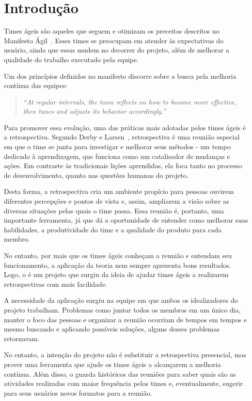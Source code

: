 \section{Introdução}
Times ágeis são aqueles que seguem e otimizam os preceitos descritos no Manifesto Ágil~\cite{manifesto}. Esses times se preocupam em atender às expectativas do usuário, ainda que essas mudem no decorrer do projeto, além de melhorar a qualidade do trabalho executado pela equipe.

Um dos princípios definidos no manifesto discorre sobre a busca pela melhoria contínua das equipes:

\begin{quote}
	\textit{``At regular intervals, the team reflects on how to become more effective, then tunes and adjusts its behavior accordingly.''}~\cite{manifesto}
\end{quote}

 Para promover essa evolução, uma das práticas mais adotadas pelos times ágeis é a retrospectiva. Segundo Derby e Larsen~\cite{retrospectives}, retrospectiva é uma reunião especial em que o time se junta para investigar e melhorar seus métodos - um tempo dedicado à aprendizagem, que funciona como um catalisador de mudanças e ações. Em contraste às tradicionais lições aprendidas, ela foca tanto no processo de desenvolvimento, quanto nas questões humanas do projeto.

Desta forma, a retrospectiva cria um ambiente propício para pessoas ouvirem diferentes percepções e pontos de vista e, assim, ampliarem a visão sobre as diversas situações pelas quais o time passa. Essa reunião é, portanto, uma importante ferramenta, já que dá a oportunidade de entender como melhorar suas habilidades, a produtividade do time e a qualidade do produto para cada membro.

No entanto, por mais que os times ágeis conheçam a reunião e entendam seu funcionamento, a aplicação da teoria nem sempre apresenta bons resultados. Logo, o \suricato{} é um projeto que surgiu da ideia de ajudar times ágeis a realizarem retrospectivas com mais facilidade.

A necessidade da aplicação surgiu na equipe em que ambos os idealizadores do projeto trabalham. Problemas como juntar todos os membros em um único dia, manter o foco das pessoas e organizar a reunião ocorriam de tempos em tempos e mesmo buscando e aplicando possíveis soluções, alguns desses problemas retornavam.

No entanto, a intenção do projeto não é substituir a retrospectiva presencial, mas prover uma ferramenta que  ajude os times ágeis a alcançarem a melhoria contínua. Além disso, o \suricato{} guarda históricos das reuniões para saber quais são as atividades realizadas com maior frequência pelos times e, eventualmente, sugerir para seus usuários novos formatos para a reunião.   

